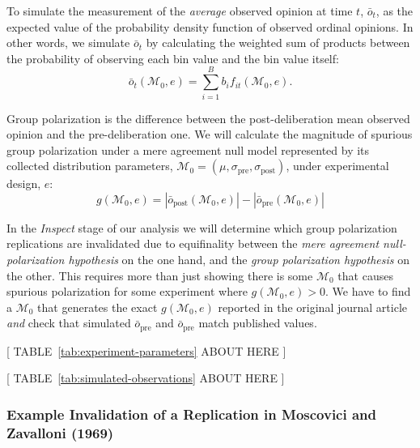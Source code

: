 \documentclass[preview]{article}
\newcommand{\nullmodel}{\mathcal{M}_0}
\begin{document}
To simulate the measurement of the \emph{average} observed opinion at
time $t$, $\bar{o}_t$, as the expected value of the probability
density function of observed ordinal opinions. In other words, we
simulate $\bar{o}_t$ by calculating the weighted sum of products
between the probability of observing each bin value and the bin value
itself: 
\begin{equation}
  \bar{o}_t(\nullmodel, e) = \sum_{i=1}^B b_i f_{it}(\nullmodel, e).
  \label{eq:expectation-model}
\end{equation}

Group polarization is the difference between the post-deliberation mean
observed opinion and the pre-deliberation one. We will calculate the
magnitude of spurious group polarization under a mere agreement null
model represented by its collected distribution parameters,
$\nullmodel = (\mu, \sigma_\mathrm{pre}, \sigma_\mathrm{post})$, under
experimental design, $e$:
\begin{equation}
  g(\nullmodel, e) = |\bar{o}_\mathrm{post}(\nullmodel, e)| - |\bar{o}_\mathrm{pre}(\nullmodel, e)|
  \label{eq:spurious-group-polarization}
\end{equation}

In the \emph{Inspect} stage of our analysis we will determine which
group polarization replications are invalidated due to equifinality
between the \emph{mere agreement null-polarization hypothesis} on the
one hand, and the \emph{group polarization hypothesis} on the other.
This requires more than just showing there is some $\nullmodel$ that causes
spurious polarization for some experiment where $g(\nullmodel, e) > 0$. We
have to find a $\nullmodel$ that generates the exact $g(\nullmodel, e)$ reported
in the original journal article \emph{and} check that simulated
$\bar{o}_\mathrm{pre}$ and $\bar{o}_\mathrm{pre}$ match published
values.

\begin{center}
  [  TABLE~\ref{tab:experiment-parameters} ABOUT HERE  ]
\end{center}

\begin{center}
  [  TABLE~\ref{tab:simulated-observations} ABOUT HERE  ]
\end{center}


\subsubsection{Example Invalidation of a Replication in Moscovici and Zavalloni
(1969)}\label{subsubsec:example-invalidation}
\end{document}
